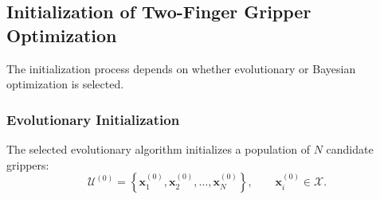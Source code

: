 



\subsection{Initialization of Two-Finger Gripper Optimization}
\label{sec:two_finger_initialization}

The initialization process depends on whether evolutionary or Bayesian optimization is selected.

\subsubsection{Evolutionary Initialization}

The selected evolutionary algorithm initializes a population of $N$ candidate grippers:
\begin{equation}
    \mathcal{U}^{(0)}
    =
    \left\{
        \mathbf{x}^{(0)}_1,
        \mathbf{x}^{(0)}_2,
        \ldots,
        \mathbf{x}^{(0)}_N
    \right\},
    \qquad
    \mathbf{x}^{(0)}_i\in\mathcal{X}.
\end{equation}

